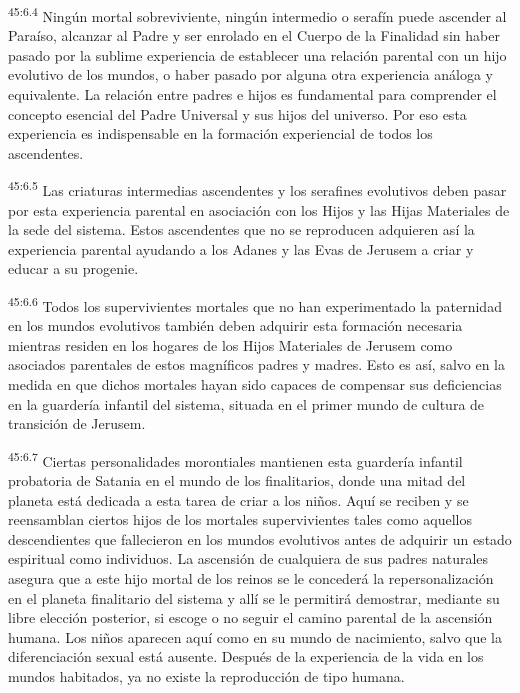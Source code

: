 \par
\textsuperscript{45:6.4} Ningún mortal sobreviviente, ningún intermedio o serafín puede ascender al Paraíso, alcanzar al Padre y ser enrolado en el Cuerpo de la Finalidad sin haber pasado por la sublime experiencia de establecer una relación parental con un hijo evolutivo de los mundos, o haber pasado por alguna otra experiencia análoga y equivalente. La relación entre padres e hijos es fundamental para comprender el concepto esencial del Padre Universal y sus hijos del universo. Por eso esta experiencia es indispensable en la formación experiencial de todos los ascendentes.

\par
\textsuperscript{45:6.5} Las criaturas intermedias ascendentes y los serafines evolutivos deben pasar por esta experiencia parental en asociación con los Hijos y las Hijas Materiales de la sede del sistema. Estos ascendentes que no se reproducen adquieren así la experiencia parental ayudando a los Adanes y las Evas de Jerusem a criar y educar a su progenie.

\par
\textsuperscript{45:6.6} Todos los supervivientes mortales que no han experimentado la paternidad en los mundos evolutivos también deben adquirir esta formación necesaria mientras residen en los hogares de los Hijos Materiales de Jerusem como asociados parentales de estos magníficos padres y madres. Esto es así, salvo en la medida en que dichos mortales hayan sido capaces de compensar sus deficiencias en la guardería infantil del sistema, situada en el primer mundo de cultura de transición de Jerusem.

\par
\textsuperscript{45:6.7} Ciertas personalidades morontiales mantienen esta guardería infantil probatoria de Satania en el mundo de los finalitarios, donde una mitad del planeta está dedicada a esta tarea de criar a los niños. Aquí se reciben y se reensamblan ciertos hijos de los mortales supervivientes tales como aquellos descendientes que fallecieron en los mundos evolutivos antes de adquirir un estado espiritual como individuos. La ascensión de cualquiera de sus padres naturales asegura que a este hijo mortal de los reinos se le concederá la repersonalización en el planeta finalitario del sistema y allí se le permitirá demostrar, mediante su libre elección posterior, si escoge o no seguir el camino parental de la ascensión humana. Los niños aparecen aquí como en su mundo de nacimiento, salvo que la diferenciación sexual está ausente. Después de la experiencia de la vida en los mundos habitados, ya no existe la reproducción de tipo humana.

